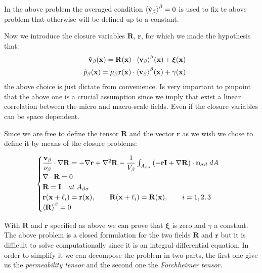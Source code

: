 In the above problem the averaged condition ${\left< \tilde{\textbf{v}}_{\beta} \right>}^{\beta} = 0$ is used to fix te above problem that otherwise will be defined up to a constant.

Now we introduce the closure variables $\mathbf{R}$, $\mathbf{r}$, for which we made the hypothesis that:
\begin{eqnarray}
&& \tilde{\textbf{v}}_{\beta}(\mathbf{x}) = \mathbf{R}(\mathbf{x})  \cdot {\left< \textbf{v}_{\beta}\right>}^{\beta}(\mathbf{x})  +\boldsymbol{\xi}(\mathbf{x})   \\
&& \tilde{p}_{\beta}(\mathbf{x})  = \mu_{\beta} \mathbf{r}(\mathbf{x})  \cdot {\left< \textbf{v}_{\beta}\right>}^{\beta}(\mathbf{x})  + \gamma(\mathbf{x})
	\label{eq:closure_viab_hp}
\end{eqnarray}
the above choice is just dictate from convenience.
Is very important to pinpoint that the above one is a crucial assumption since we imply that exist a linear correlation between the micro and macro-scale fields.
Even if the closure variables can be space dependent.

Since we are free to define the tensor $\mathbf{R}$  and the vector $\mathbf{r}$ as we wish we chose to define it by means of the closure problems:

\begin{eqnarray}
	\begin{cases}
		\dfrac{\textbf{v}_{\beta}}{\nu_{\beta}} \cdot  \nabla \mathbf{R} = -\nabla \mathbf{r} + \nabla^2 \mathbf{R} - \dfrac{1}{V_\beta} \int_{A_{\beta \sigma}} \left(-\mathbf{r}\mathbf{I}  +  \nabla \mathbf{R} \right) \cdot \mathbf{n}_{\sigma \beta} \;dA  \\
		\nabla \cdot \mathbf{R} = 0  \\
		\mathbf{R} = \mathbf{I} \quad at \; A_{\beta \sigma} \\
		\mathbf{r}(\mathbf{x} +\ell_i) = \mathbf{r}(\mathbf{x}), \qquad \mathbf{R}(\mathbf{x} +\ell_i) = \mathbf{R}(\mathbf{x}), \qquad i=1,2,3 \\
		{\left< \mathbf{R} \right>}^{\beta} = 0
	\end{cases}
\label{eq:R_problem}
\end{eqnarray}

With  $\mathbf{R}$ and $\mathbf{r}$ specified as above we can prove that $\boldsymbol{\xi}$ is zero and $\gamma$ a constant.
The above problem is a closed formulation for the two fields  $\mathbf{R}$ and $\mathbf{r}$ but it is difficult to solve computationally since it is an integral-differential equation.
In order to simplify it we can decompose the problem in two parts, the first one give us the \textit{permeability tensor} and the second one the \textit{Forchheimer tensor}.


